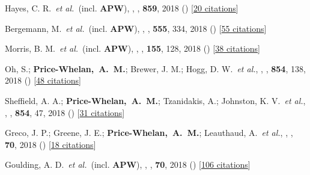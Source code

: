 \item[{\color{deemph}\scriptsize39}]Hayes, C. R.~\textit{et al.}~(incl. \textbf{APW}), , \apj, \textbf{859}, 2018 () [\href{http://adsabs.harvard.edu/abs/2018ApJ...859L...8H}{20 citations}]

\item[{\color{deemph}\scriptsize38}]Bergemann, M.~\textit{et al.}~(incl. \textbf{APW}), , \nature, \textbf{555}, 334, 2018 () [\href{http://adsabs.harvard.edu/abs/2018Natur.555..334B}{55 citations}]

\item[{\color{deemph}\scriptsize37}]Morris, B. M.~\textit{et al.}~(incl. \textbf{APW}), , \aj, \textbf{155}, 128, 2018 () [\href{http://adsabs.harvard.edu/abs/2018AJ....155..128M}{38 citations}]

\item[{\color{deemph}\scriptsize36}]Oh, S.; \textbf{Price-Whelan,~A.~M.}; Brewer, J. M.; Hogg, D. W.~\textit{et al.}, , \apj, \textbf{854}, 138, 2018 () [\href{http://adsabs.harvard.edu/abs/2018ApJ...854..138O}{48 citations}]

\item[{\color{deemph}\scriptsize35}]Sheffield, A. A.; \textbf{Price-Whelan,~A.~M.}; Tzanidakis, A.; Johnston, K. V.~\textit{et al.}, , \apj, \textbf{854}, 47, 2018 () [\href{http://adsabs.harvard.edu/abs/2018ApJ...854...47S}{31 citations}]

\item[{\color{deemph}\scriptsize34}]Greco, J. P.; Greene, J. E.; \textbf{Price-Whelan,~A.~M.}; Leauthaud, A.~\textit{et al.}, , \pasj, \textbf{70}, 2018 () [\href{http://adsabs.harvard.edu/abs/2018PASJ...70S..19G}{18 citations}]

\item[{\color{deemph}\scriptsize33}]Goulding, A. D.~\textit{et al.}~(incl. \textbf{APW}), , \pasj, \textbf{70}, 2018 () [\href{http://adsabs.harvard.edu/abs/2018PASJ...70S..37G}{106 citations}]


